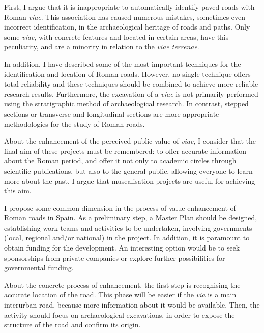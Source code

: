 
First, I argue that it is inappropriate to automatically identify paved roads with Roman \textit{viae}. This association has caused numerous mistakes, sometimes even incorrect identification, in the archaeological heritage of roads and paths. Only some \textit{viae}, with concrete features and located in certain areas, have this peculiarity, and are a minority in relation to the \textit{viae terrenae}.
 
In addition, I have described some of the most important techniques for the identification and location of Roman roads. However, no single technique offers total reliability and these techniques should be combined to achieve more reliable research results. Furthermore, the excavation of a \textit{viae} is not primarily performed using the stratigraphic method of archaeological research. In contrast, stepped sections or transverse and longitudinal sections are more appropriate methodologies for the study of Roman roads.


About the enhancement of the perceived public value of \textit{viae}, I consider that the final aim of these projects must be remembered: to offer accurate information about the Roman period, and offer it not only to academic circles through scientific publications, but also to the general public, allowing everyone to learn more about the past. I argue that musealisation projects are useful for achieving this aim. 

I propose some common dimension in the process of value enhancement of Roman roads in Spain. As a preliminary step, a Master Plan should be designed, establishing work teams and activities to be undertaken, involving governments (local, regional and/or national) in the project. In addition, it is paramount to obtain funding for the development. An interesting option would be to seek sponsorships from private companies or explore further possibilities for governmental funding.

About the concrete process of enhancement, the first step is recognising the accurate location of the road. This phase will be easier if the \textit{via} is a main interurban road, because more information about it would be available. Then, the activity should focus on archaeological excavations, in order to expose the structure of the road and confirm its origin.

